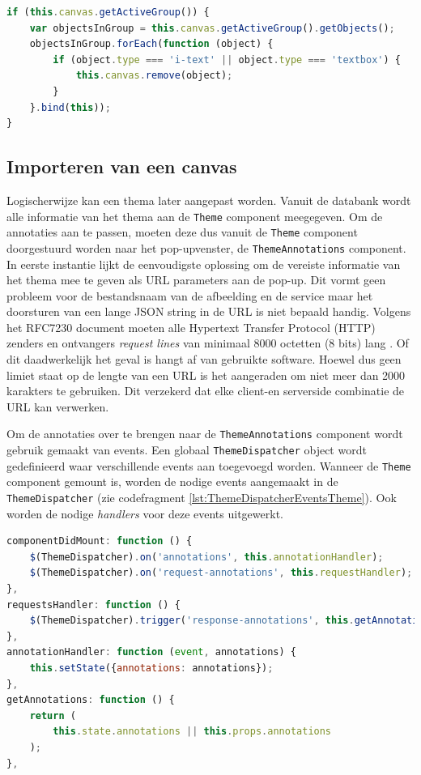\begin{lstlisting}[caption={ThemeAnnotations component - delete group},label=lst:ThemeAnnotationsDeleteGroup,language=javascript]
if (this.canvas.getActiveGroup()) {
	var objectsInGroup = this.canvas.getActiveGroup().getObjects();
	objectsInGroup.forEach(function (object) {
		if (object.type === 'i-text' || object.type === 'textbox') {
			this.canvas.remove(object);
		}
	}.bind(this));
}
\end{lstlisting}

\subsection{Importeren van een canvas}
Logischerwijze kan een thema later aangepast worden. Vanuit de databank wordt alle informatie van het thema aan de \texttt{Theme} component meegegeven. Om de annotaties aan te passen, moeten deze dus vanuit de \texttt{Theme} component doorgestuurd worden naar het pop-upvenster, de \texttt{ThemeAnnotations} component. In eerste instantie lijkt de eenvoudigste oplossing om de vereiste informatie van het thema mee te geven als URL parameters aan de pop-up. Dit vormt geen probleem voor de bestandsnaam van de afbeelding en de service maar het doorsturen van een lange JSON string in de URL is niet bepaald handig. Volgens het RFC7230 document moeten alle Hypertext Transfer Protocol (HTTP) zenders en ontvangers \textit{request lines} van minimaal 8000 octetten (8 bits) lang \cite{RFC7230}. Of dit daadwerkelijk het geval is hangt af van gebruikte software. %
Hoewel dus geen limiet staat op de lengte van een URL is het aangeraden om niet meer dan 2000 karakters te gebruiken. Dit verzekerd dat elke client-en serverside combinatie de URL kan verwerken. %

Om de annotaties over te brengen naar de \texttt{ThemeAnnotations} component wordt gebruik gemaakt van events. Een globaal \texttt{ThemeDispatcher} object wordt gedefinieerd waar verschillende events aan toegevoegd worden. Wanneer de \texttt{Theme} component gemount is, worden de nodige events aangemaakt in de \texttt{ThemeDispatcher} (zie codefragment \ref{lst:ThemeDispatcherEventsTheme}). Ook worden de nodige \textit{handlers} voor deze events uitgewerkt.

\begin{lstlisting}[caption={Theme component - events},label=lst:ThemeDispatcherEventsTheme,language=javascript]
componentDidMount: function () {
	$(ThemeDispatcher).on('annotations', this.annotationHandler);
	$(ThemeDispatcher).on('request-annotations', this.requestHandler);
},
requestsHandler: function () {
	$(ThemeDispatcher).trigger('response-annotations', this.getAnnotations());
},
annotationHandler: function (event, annotations) {
	this.setState({annotations: annotations});
},
getAnnotations: function () {
	return (
		this.state.annotations || this.props.annotations
	);
},
\end{lstlisting}

